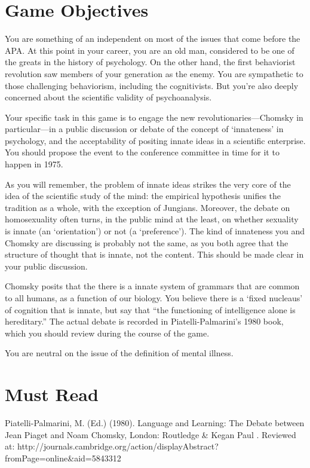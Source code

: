 \begin{refsection}
\section{Game Objectives}
\label{gameobjectives}

You are something of an independent on most of the issues that come before the APA. At this point in your career, you are an old man, considered to be one of the greats in the history of psychology. On the other hand, the first behaviorist revolution saw members of your generation as the enemy. You are sympathetic to those challenging behaviorism, including the cognitivists. But you're also deeply concerned about the scientific validity of psychoanalysis.

Your specific task in this game is to engage the new revolutionaries---Chomsky in particular---in a public discussion or debate of the concept of `innateness' in psychology, and the acceptability of positing innate ideas in a scientific enterprise. You should propose the event to the conference committee in time for it to happen in 1975.

As you will remember, the problem of innate ideas strikes the very core of the idea of the scientific study of the mind: the empirical hypothesis unifies the tradition as a whole, with the exception of Jungians. Moreover, the debate on homosexuality often turns, in the public mind at the least, on whether sexuality is innate (an `orientation') or not (a `preference'). The kind of innateness you and Chomsky are discussing is probably not the same, as you both agree that the structure of thought that is innate, not the content. This should be made clear in your public discussion.

Chomsky posits that the there is a innate system of grammars that are common to all humans, as a function of our biology. You believe there is a `fixed nucleaus' of cognition that is innate, but say that ``the functioning of intelligence alone is hereditary.'' The actual debate is recorded in Piatelli-Palmarini's 1980 book, which you should review during the course of the game.

You are neutral on the issue of the definition of mental illness.

\section{Must Read}
\label{mustread}

Piatelli-Palmarini, M. (Ed.) (1980). Language and Learning: The Debate between Jean Piaget and Noam Chomsky, London: Routledge \& Kegan Paul . Reviewed at: http:\slash \slash journals.cambridge.org\slash action\slash displayAbstract?fromPage=online\&aid=5843312


\end{refsection}
